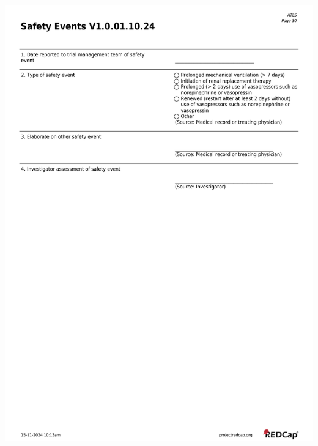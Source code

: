 \documentclass[
]{scrartcl}
\begin{document}
\includegraphics{../case-record-form/instrument-pdfs/pages/all-instruments-30.pdf}
\end{document}

